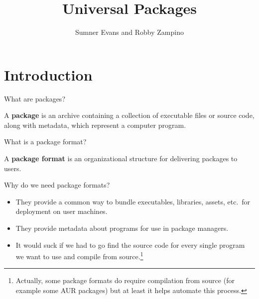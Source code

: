 \documentclass{lug}
\title{Universal Packages}
\author{Sumner Evans and Robby Zampino}
\institute{Mines Linux Users Group}
\begin{document}
\section{Introduction}

\begin{frame}{What are packages?}
    \begin{center}
        A \textbf{package} is an archive containing a collection of executable
        files or source code, along with metadata, which represent a computer
        program.
    \end{center}
\end{frame}

\begin{frame}{What is a package format?}
    \begin{center}
        A \textbf{package format} is an organizational structure for delivering
        packages to users.
    \end{center}
\end{frame}

\begin{frame}{Why do we need package formats?}
    \begin{itemize}
        \item They provide a common way to bundle executables, libraries,
            assets, etc.\ for deployment on user machines.
        \item They provide metadata about programs for use in package managers.
        \item It would suck if we had to go find the source code for every
            single program we want to use and compile from
            source.\footnote[frame]{Actually, some package formats do require
            compilation from source (for example some AUR packages) but at least
            it helps automate this process.}
    \end{itemize}
\end{frame}
\end{document}
